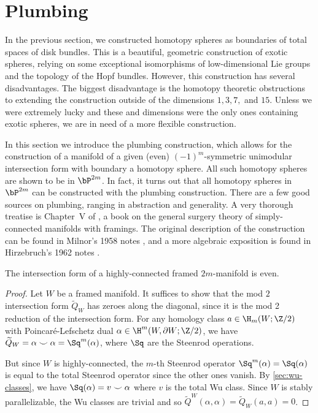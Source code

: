 \pagebreak
\section{Plumbing}\label{sec:plumbing}

In the previous section, we constructed homotopy spheres as boundaries of total spaces of disk bundles. This is a beautiful, geometric construction of exotic spheres, relying on some exceptional isomorphisms of low-dimensional Lie groups and the topology of the Hopf bundles.
However, this construction has several disadvantages.
The biggest disadvantage is the homotopy theoretic obstructions to extending the construction outside of the dimensions $1,3,7,$ and $15$. Unless we were extremely lucky and these and dimensions were the only ones containing exotic spheres, we are in need of a more flexible construction.

In this section we introduce the plumbing construction, which allows for the construction of a manifold of a given (even) $(-1)^m$-symmetric unimodular intersection form with boundary a homotopy sphere. All such homotopy spheres are shown to be in $\bP^{2m}$. In fact, it turns out that all homotopy spheres in $\bP^{2m}$ can be constructed with the plumbing construction.
There are a few good sources on plumbing, ranging in abstraction and generality. A very thorough treatise is Chapter~V of \cite{browder1972surgery}, a book on the general surgery theory of simply-connected manifolds with framings. The original description of the construction can be found in Milnor's 1958 notes \cite{milnor1958manifolds}, and a more algebraic exposition is found in Hirzebruch's 1962 notes \cite{hirzebruch1971quadratic}.

\begin{proposition}\label{prop:intersection-form-even}
	The intersection form of a highly-connected framed $2m$-manifold is even.
\end{proposition}
\begin{proof}
	Let $W$ be a framed manifold. It suffices to show that the mod $2$ intersection form $\widetilde{Q}_W$ has zeroes along the diagonal, since it is the mod 2 reduction of the intersection form. For any homology class $a\in \H_{m}(W;\Z/2)$ with Poincar\'e-Lefschetz dual $\alpha\in \H^{m}(W,\partial W;\Z/2)$, we have $\widetilde{Q}_W = \alpha\smile \alpha = \Sq^m(\alpha)$, where $\Sq$ are the Steenrod operations.

	But since $W$ is highly-connected, the $m$-th Steenrod operator $\Sq^m(\alpha)=\Sq(\alpha)$ is equal to the total Steenrod operator since the other ones vanish. By \cref{sec:wu-classes}, we have $\Sq(\alpha)=v\smile \alpha$ where $v$ is the total Wu class. Since $W$ is stably parallelizable, the Wu classes are trivial and so $\widetilde{Q}^W(\alpha,\alpha)=\widetilde{Q}_W(a,a)=0$.
\end{proof}

